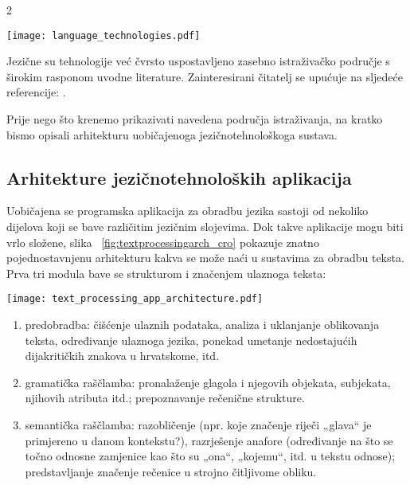 \begin{multicols}{2}
\begin{figure*}[htb]
  \center
  \texttt{[image: language\_technologies.pdf]}
  \caption{Jezične tehnologije}
  \label{fig:ltincontext_cro}
\end{figure*}

Jezične su tehnologije već čvrsto uspostavljeno zasebno istraživačko područje s širokim rasponom uvodne literature. Zainteresirani čitatelj se upućuje na sljedeće referencije: \cite{pro12, boo7, boo8, str37, boo9}.

Prije nego što krenemo prikazivati navedena područja istraživanja, na kratko bismo opisali arhitekturu uobičajenoga jezičnotehnološkoga sustava.


\subsection{Arhitekture jezičnotehnoloških aplikacija}

Uobičajena se programska aplikacija za obradbu jezika sastoji od nekoliko dijelova koji se bave različitim jezičnim slojevima. Dok takve aplikacije mogu biti vrlo složene, slika ~\ref{fig:textprocessingarch_cro} pokazuje znatno pojednostavnjenu arhitekturu kakva se može naći u sustavima za obradbu teksta. Prva tri modula bave se strukturom i značenjem ulaznoga teksta:

\begin{figure*}[b]
  \center
  \texttt{[image: text\_processing\_app\_architecture.pdf]}
  \caption{Tipična aplikacija za obradu teksta}
  \label{fig:textprocessingarch_cro}
\end{figure*}

\begin{enumerate}
\item predobradba: čišćenje ulaznih podataka, analiza i uklanjanje oblikovanja teksta, određivanje ulaznoga jezika, ponekad umetanje nedostajućih dijakritičkih znakova u hrvatskome, itd.
\item gramatička raščlamba: pronalaženje glagola i njegovih objekata, subjekata, njihovih atributa itd.; prepoznavanje rečenične strukture.
\item semantička raščlamba: razobličenje (npr. koje značenje riječi „glava“ je primjereno u danom kontekstu?), razrješenje anafore (određivanje na što se točno odnosne zamjenice kao što su „ona“, „kojemu“, itd. u tekstu odnose); predstavljanje značenje rečenice u strojno čitljivome obliku.
\end{enumerate}


\end{multicols}
